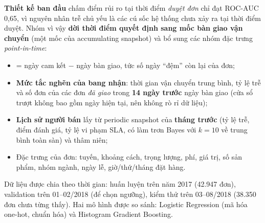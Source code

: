 \documentclass[a4paper]{article}
\DeclareRobustCommand{\code}[1]{\texttt{\detokenize{#1}}}
\begin{document}
\textbf{Thiết kế ban đầu} chấm điểm rủi ro tại thời điểm \textit{duyệt đơn} chỉ đạt ROC-AUC 0,65, vì nguyên nhân trễ chủ yếu là các cú sốc hệ thống chưa xảy ra tại thời điểm duyệt. Nhóm vì vậy \textbf{dời thời điểm quyết định sang mốc bàn giao vận chuyển} (một mốc của accumulating snapshot) và bổ sung các nhóm đặc trưng \textit{point-in-time}:
\begin{itemize}
    \item \code{slack_days} = ngày cam kết $-$ ngày bàn giao, tức số ngày ``đệm'' còn lại của đơn;
    \item \textbf{Mức tắc nghẽn của bang nhận}: thời gian vận chuyển trung bình, tỷ lệ trễ và số đơn của các đơn \textit{đã giao} trong \textbf{14 ngày trước} ngày bàn giao (cửa sổ trượt không bao gồm ngày hiện tại, nên không rò rỉ dữ liệu);
    \item \textbf{Lịch sử người bán} lấy từ periodic snapshot của \textbf{tháng trước} (tỷ lệ trễ, điểm đánh giá, tỷ lệ vi phạm SLA, có làm trơn Bayes với $k = 10$ về trung bình toàn sàn) và thâm niên;
    \item Đặc trưng của đơn: tuyến, khoảng cách, trọng lượng, phí, giá trị, số sản phẩm, nhóm ngành, ngày lễ, giờ/thứ/tháng đặt hàng.
\end{itemize}
Dữ liệu được chia theo thời gian: huấn luyện trên năm 2017 (42.947 đơn), validation trên 01--02/2018 (để chọn ngưỡng), kiểm thử trên 03--08/2018 (38.350 đơn chưa từng thấy). Hai mô hình được so sánh: Logistic Regression (mã hóa one-hot, chuẩn hóa) và Histogram Gradient Boosting.
\end{document}
